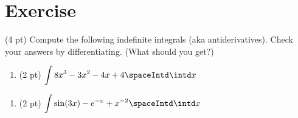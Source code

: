 %
%
%
%

\section{Exercise}


(4 pt) Compute the following indefinite integrals (aka antiderivatives). Check your answers by differentiating. (What should you get?)

\begin{enumerate}[label=(\alph*)]
\item\label{itm : LQ10Aa} (2 pt) $\displaystyle\int 8 x^{3} - 3 x^{2} - 4 x + 4 \spaceIntd \intd x$
\end{enumerate}

\spaceSolution{3in}{%
}%



\begin{enumerate}[resume,label=(\alph*)]
\item\label{itm : LQ10Ab} (2 pt) $\displaystyle\int \sin(3 x) - e^{-x} + x^{-2} \spaceIntd \intd x$
\end{enumerate}

\spaceSolution{3in}{%
}%